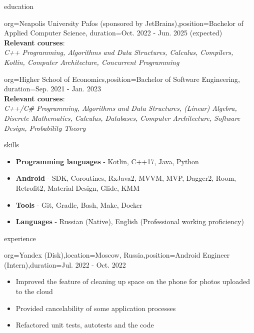 \documentclass{resume}
\begin{document}
\makeheader

\begin{ResumeSection}{education}
    \begin{ResumeSubsection}{org={Neapolis University Pafos (sponsored by JetBrains)},position={Bachelor of Applied Computer Science}, duration={Oct. 2022 - Jun. 2025 (expected)}} \\
    \textbf{Relevant courses}: \\
    \textit{C++ Programming, Algorithms and Data Structures, Calculus, Compilers, Kotlin, Computer Architecture, Concurrent Programming} \\ 
    \end{ResumeSubsection}
    \begin{ResumeSubsection}{org={Higher School of Economics},position={Bachelor of Software Engineering}, duration={Sep. 2021 - Jan. 2023}} \\
    \textbf{Relevant courses}: \\
    \textit{C++/C\# Programming, Algorithms and Data Structures, (Linear) Algebra, Discrete Mathematics, Calculus, Databases, Computer Architecture, Software Design, Probability Theory}
    \end{ResumeSubsection}
\end{ResumeSection}

\begin{ResumeSection}{skills}
    \newcommand{\skill}[2]{\textbf{#1} - #2}
        \begin{itemize}
            \item \skill{Programming languages}{Kotlin, C++17, Java, Python}
            \item \skill{Android}{SDK, Coroutines, RxJava2, MVVM, MVP, Dagger2, Room, Retrofit2, Material Design, Glide, KMM}
            \item \skill{Tools}{Git, Gradle, Bash, Make, Docker}
            \item \skill{Languages}{Russian (Native), English (Professional working proficiency)}
        \end{itemize}
\end{ResumeSection}

\begin{ResumeSection}{experience}
    \begin{ResumeSubsection}{org=Yandex (Disk),location={Moscow, Russia},position={Android Engineer (Intern)},duration=Jul. 2022 - Oct. 2022} 
        \begin{itemize}
            \item Improved the feature of cleaning up space on the phone for photos uploaded to the cloud
            \item Provided cancelability of some application processes
            \item Refactored unit tests, autotests and the code
        \end{itemize}
    \end{ResumeSubsection}
\end{ResumeSection}
\end{document}
